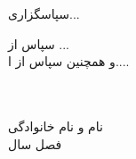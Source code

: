 \clearpage
\thispagestyle{empty}
\begin{flushright}
\begin{nastaliq}
\begin{Huge}
سپاسگزاری...
\end{Huge}
\end{nastaliq}
\end{flushright}
\vskip 1cm
\qquad 
\begin{nastaliq}
\begin{large}
\quad 
\begin{flushright}
سپاس از ...\\[0.5cm]
\quad 
و همچنين سپاس از ا....\\
\vskip 1cm
\quad \\
\vskip 1cm
 \quad  \\

\end{flushright}
\begin{flushleft}
نام و نام خانوادگی\\
فصل سال
\end{flushleft}
\end{large}
\end{nastaliq}